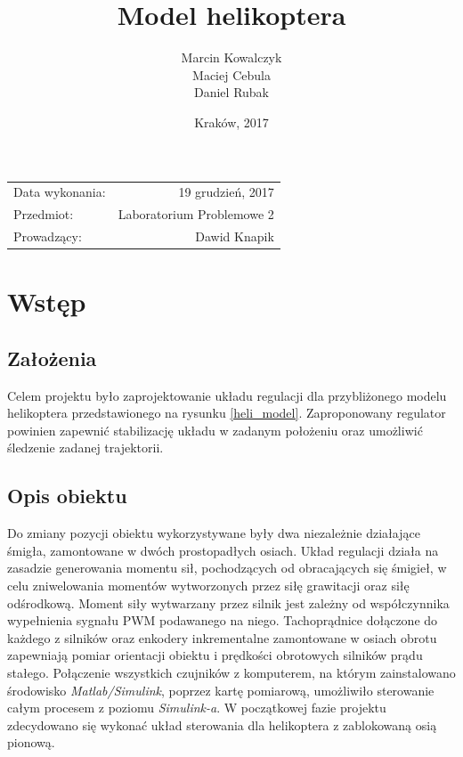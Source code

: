 \documentclass[11pt,a4paper]{article}
\title{\textbf{Model helikoptera}} %
\author{Marcin Kowalczyk \\ Maciej Cebula \\ Daniel Rubak} %
\date{Kraków, 2017} %
\begin{document}
\maketitle %

\begin{center}
\begin{tabular}{l r}
Data wykonania: & 19 grudzień, 2017 \\ %
Przedmiot: & Laboratorium Problemowe 2 \\
Prowadzący: & Dawid Knapik %
\end{tabular}
\end{center}

\clearpage
\tableofcontents
\clearpage

\section{Wstęp}
\label{sec:wstep}
\subsection{Założenia}
Celem projektu było zaprojektowanie układu regulacji dla przybliżonego modelu helikoptera przedstawionego na rysunku \ref {heli_model}. Zaproponowany regulator powinien zapewnić stabilizację układu w zadanym położeniu oraz umożliwić śledzenie zadanej trajektorii. 
\subsection{Opis obiektu}
Do zmiany pozycji obiektu wykorzystywane były dwa niezależnie działające śmigła, zamontowane w dwóch prostopadłych osiach. Układ regulacji działa na zasadzie generowania momentu sił, pochodzących od obracających się śmigieł, w celu zniwelowania momentów wytworzonych przez siłę grawitacji oraz siłę odśrodkową. Moment siły wytwarzany przez silnik jest zależny od współczynnika wypełnienia sygnału PWM podawanego na niego. Tachoprądnice dołączone do każdego z silników oraz enkodery inkrementalne zamontowane w osiach obrotu  zapewniają pomiar orientacji obiektu i prędkości obrotowych silników prądu stałego. Połączenie wszystkich czujników z komputerem, na którym zainstalowano środowisko \textit{Matlab/Simulink}, poprzez kartę pomiarową, umożliwiło sterowanie całym procesem z poziomu \textit{Simulink-a}. W początkowej fazie projektu zdecydowano się wykonać układ sterowania dla helikoptera z zablokowaną osią pionową. 
\end{document}
